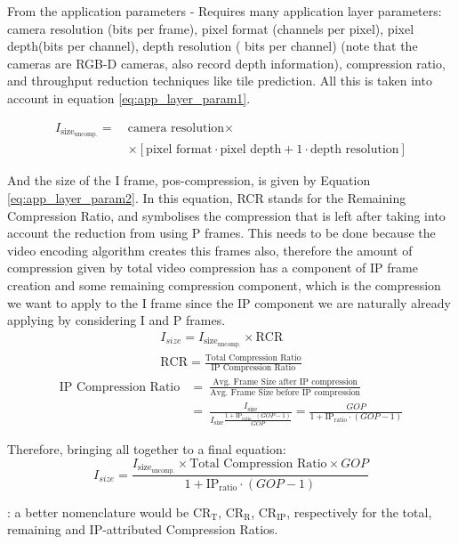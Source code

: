 \label{sec:beam_steering}


From the application parameters - Requires many application layer parameters: camera resolution (bits per frame), pixel format (channels per pixel), pixel depth(bits per channel), depth resolution ( bits per channel) (note that the cameras are RGB-D cameras, also record depth information), compression ratio, and throughput reduction techniques like tile prediction.
All this is taken into account in equation \eqref{eq:app_layer_param1}. 

\begin{align}
    I_{{\text{size}}_\text{uncomp.}} = \ & \text{camera resolution} \times \nonumber \\
    & \times \left[  \text{pixel format} \cdot \text{pixel depth} + 1 \cdot \text{depth resolution} \right]  \label{eq:app_layer_param1}
\end{align}

And the size of the I frame, pos-compression, is given by Equation \eqref{eq:app_layer_param2}. In this equation, RCR stands for the Remaining Compression Ratio, and symbolises the compression that is left after taking into account the reduction from using P frames. This needs to be done because the video encoding algorithm creates this frames also, therefore the amount of compression given by total video compression has a component of IP frame creation and some remaining compression component, which is the compression we want to apply to the I frame since the IP component we are naturally already applying by considering I and P frames.
\begin{gather}
    I_{size} = I_{{\text{size}}_\text{uncomp.}} \times \text{RCR}  \label{eq:app_layer_param2} \\
    \text{RCR} = \frac{\text{Total Compression Ratio}}{\text{IP Compression Ratio}} \label{eq:app_layer_param3} 
\end{gather}
\begin{align}
    \text{IP Compression Ratio} & = \ \frac{\text{Avg. Frame Size after IP compression}}{\text{Avg. Frame Size before IP compression}} \nonumber \\
    & = \ \frac{I_\text{size}}{I_\text{size} \frac{1 + \text{IP}_\text{ratio} \cdot (GOP - 1)}{GOP}} = \frac{GOP}{1 + \text{IP}_\text{ratio} \cdot (GOP - 1)}\label{eq:app_layer_param4} 
\end{align}

Therefore, bringing all together to a final equation:
\begin{equation}
    I_{size} = \frac{I_{{\text{size}}_\text{uncomp.}} \times \text{Total Compression Ratio} \times GOP}{1 + \text{IP}_\text{ratio} \cdot (GOP - 1)}
\end{equation}

: a better nomenclature would be $\text{CR}_\text{T}$, $\text{CR}_\text{R}$, $\text{CR}_\text{IP}$, respectively for the total, remaining and IP-attributed Compression Ratios.
